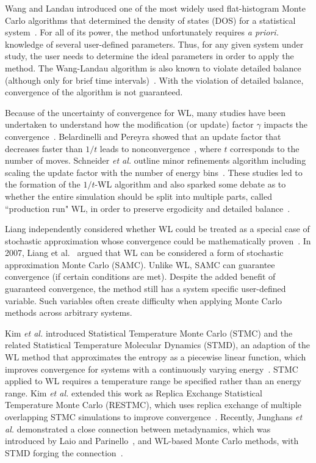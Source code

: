 \documentclass[letterpaper,twocolumn,amsmath,amssymb,pre,aps,10pt]{revtex4-1}
\begin{document}
Wang and Landau introduced one of the most widely used flat-histogram
Monte Carlo algorithms that determined the density of states (DOS) for
a statistical system~\cite{wang2001determining,wang2001efficient}. For all of
its power, the method unfortunately requires \emph{a priori.} knowledge of several
user-defined parameters. Thus, for any given system under study, the user needs
to determine the ideal parameters in order to apply the method. The Wang-Landau
algorithm is also known to violate detailed balance (although only for brief
time intervals)~\cite{yan2003fast, shell2002generalization}. With the violation
of detailed balance, convergence of the algorithm is not guaranteed.

Because of the uncertainty of convergence for WL, many studies have been undertaken
to understand how the modification (or update) factor $\gamma$ impacts the
convergence~\cite{zhou2005understanding,lee2006convergence,
belardinelli2007wang}. Belardinelli and Pereyra showed that an update factor that decreases faster than $1/t$ leads to nonconvergence~\cite{belardinelli2007wang, belardinelli2008analysis, zhou2008optimal}, where $t$ corresponds to the number of moves. Schneider \emph{et al.} outline minor refinements algorithm including scaling the update factor with the number of energy bins~\cite{schneider2017convergence}.
These studies led to the
formation of the $1/t$-WL algorithm and also sparked some debate as to whether
the entire simulation should be split into multiple parts, called ``production run" WL, in order to preserve ergodicity and
detailed balance~\cite{jayasri2005wang, mukhopadhyay2008monte}.

Liang independently considered whether WL could be treated as a special case of
stochastic approximation whose convergence could be mathematically
proven~\cite{liang2006theory, liang2007stochastic}. In 2007, Liang et
al.~\cite{liang2007stochastic} argued that WL can be considered a form of
stochastic approximation Monte Carlo (SAMC). Unlike WL, SAMC can guarantee
convergence (if certain conditions are met). Despite the added benefit of
guaranteed convergence, the method still has a system specific user-defined
variable. Such variables often create difficulty when applying Monte Carlo
methods across arbitrary systems.

Kim \emph{et al.} introduced Statistical Temperature Monte Carlo (STMC) and the
related Statistical Temperature Molecular Dynamics (STMD), an adaption
of the WL method that approximates the entropy as a piecewise linear function,
which improves convergence for systems with a continuously varying
energy~\cite{kim2006statistical, kim2007statistical}. STMC applied to WL
requires a temperature range be specified rather than an energy range.  Kim
\emph{et al.} extended this work as Replica Exchange Statistical Temperature
Monte Carlo (RESTMC), which uses replica exchange of multiple overlapping STMC
simulations to improve convergence~\cite{kim2009replica}. Recently,
Junghans \emph{et al.} demonstrated a close connection between
metadynamics, which was introduced by Laio and
Parinello~\cite{laio2002escaping}, and WL-based Monte Carlo methods, with STMD
forging the connection~\cite{junghans2014molecular}.
\end{document}
